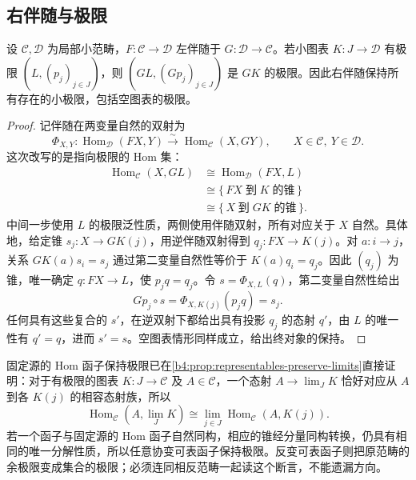 \subsection{右伴随与极限}
\label{b4:subsec:0304:02}

\begin{theorem}\label{b4:thm:adjoints-preserve-limits}
	设 \(\mathcal C,\mathcal D\) 为局部小范畴，\(F:\mathcal C\rightarrow\mathcal D\) 左伴随于 \(G:\mathcal D\rightarrow\mathcal C\)。若小图表 \(K:J\rightarrow\mathcal D\) 有极限 \((L,(p_j)_{j\in J})\)，则 \((GL,(Gp_j)_{j\in J})\) 是 \(GK\) 的极限。因此右伴随保持所有存在的小极限，包括空图表的极限。
\end{theorem}
\begin{proof}
	记伴随在两变量自然的双射为
	\[
		\Phi_{X,Y}:\operatorname{Hom}_{\mathcal D}(FX,Y) \xrightarrow{\sim}\operatorname{Hom}_{\mathcal C}(X,GY), \qquad X\in\mathcal C,\ Y\in\mathcal D.
	\]
	这次改写的是指向极限的 Hom 集：
	\[
		\begin{aligned}
			\operatorname{Hom}_{\mathcal C}(X,GL) &\cong\operatorname{Hom}_{\mathcal D}(FX,L)\\
			&\cong\{\,FX\;\text{到}\;K\;\text{的锥}\,\}\\
			&\cong\{\,X\;\text{到}\;GK\;\text{的锥}\,\}.
		\end{aligned}
	\]
	中间一步使用 \(L\) 的极限泛性质，两侧使用伴随双射，所有对应关于 \(X\) 自然。具体地，给定锥 \(s_j:X\rightarrow GK(j)\)，用逆伴随双射得到 \(q_j:FX\rightarrow K(j)\)。对 \(a:i\rightarrow j\)，关系 \(GK(a)s_i=s_j\) 通过第二变量自然性等价于 \(K(a)q_i=q_j\)。因此 \((q_j)\) 为锥，唯一确定 \(q:FX\rightarrow L\)，使 \(p_jq=q_j\)。令 \(s=\Phi_{X,L}(q)\)，第二变量自然性给出
	\[
		Gp_j\circ s=\Phi_{X,K(j)}(p_jq)=s_j.
	\]
	任何具有这些复合的 \(s'\)，在逆双射下都给出具有投影 \(q_j\) 的态射 \(q'\)，由 \(L\) 的唯一性有 \(q'=q\)，进而 \(s'=s\)。空图表情形同样成立，给出终对象的保持。
\end{proof}

固定源的 Hom 函子保持极限已在\cref{b4:prop:representables-preserve-limits}直接证明：对于有极限的图表 \(K:J\rightarrow\mathcal C\) 及 \(A\in\mathcal C\)，一个态射 \(A\rightarrow\lim_JK\) 恰好对应从 \(A\) 到各 \(K(j)\) 的相容态射族，所以
\[
	\operatorname{Hom}_{\mathcal C}(A,\lim_JK) \cong\lim_{j\in J}\operatorname{Hom}_{\mathcal C}(A,K(j)).
\]
若一个函子与固定源的 Hom 函子自然同构，相应的锥经分量同构转换，仍具有相同的唯一分解性质，所以任意协变可表函子保持极限。反变可表函子则把原范畴的余极限变成集合的极限；必须连同相反范畴一起读这个断言，不能遗漏方向。

